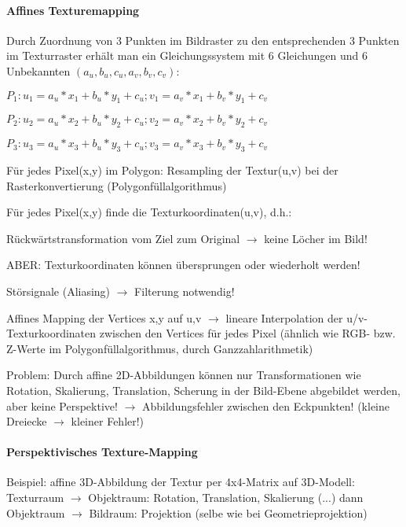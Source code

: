 \documentclass[landscape]{article}
\begin{document}
\begin{multicols}{3}
  \paragraph{Affines Texturemapping}
  Durch Zuordnung von 3 Punkten im Bildraster zu den entsprechenden 3 Punkten im Texturraster erhält man ein Gleichungssystem mit 6 Gleichungen und 6 Unbekannten $(a_u , b_u , c_u , a_v , b_v , c_v )$:
  \begin{itemize*}
    \item $P_1: u_1=a_u*x_1+b_u*y_1+c_u; v_1=a_v*x_1+b_v*y_1+c_v$
    \item $P_2: u_2=a_u*x_2+b_u*y_2+c_u; v_2=a_v*x_2+b_v*y_2+c_v$
    \item $P_3: u_3=a_u*x_3+b_u*y_3+c_u; v_3=a_v*x_3+b_v*y_3+c_v$
  \end{itemize*}
  
  Für jedes Pixel(x,y) im Polygon: Resampling der Textur(u,v) bei der Rasterkonvertierung (Polygonfüllalgorithmus)
  
  Für jedes Pixel(x,y) finde die Texturkoordinaten(u,v), d.h.:
  \begin{itemize*}
    \item Rückwärtstransformation vom Ziel zum Original $\rightarrow$ keine Löcher im Bild!
    \item ABER: Texturkoordinaten können übersprungen oder wiederholt werden!
    \item Störsignale (Aliasing) $\rightarrow$ Filterung notwendig!
  \end{itemize*}
  
  Affines Mapping der Vertices x,y auf u,v $\rightarrow$ lineare Interpolation der u/v-Texturkoordinaten zwischen den Vertices für jedes Pixel (ähnlich wie RGB- bzw. Z-Werte im Polygonfüllalgorithmus, durch Ganzzahlarithmetik)
  
  
  Problem: Durch affine 2D-Abbildungen können nur Transformationen wie Rotation, Skalierung, Translation, Scherung in der Bild-Ebene abgebildet werden, aber keine Perspektive! $\rightarrow$ Abbildungsfehler zwischen den Eckpunkten! (kleine Dreiecke $\rightarrow$ kleiner Fehler!)
  
  \paragraph{Perspektivisches Texture-Mapping}
  Beispiel: affine 3D-Abbildung der Textur per 4x4-Matrix auf 3D-Modell: 
  Texturraum $\rightarrow$ Objektraum: Rotation, Translation, Skalierung (...) dann Objektraum $\rightarrow$ Bildraum: Projektion (selbe wie bei Geometrieprojektion)
  

\end{multicols}
\end{document}
